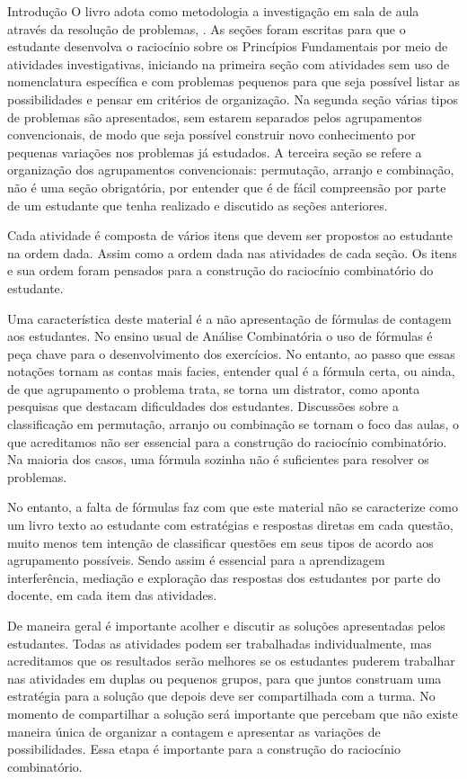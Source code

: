 \begin{apresentacao}{Introdução}
O livro adota como metodologia a investigação em sala de aula através da resolução de problemas, \cite{Ponte}. As seções foram escritas para que o estudante desenvolva o raciocínio sobre os Princípios Fundamentais por meio de atividades investigativas, iniciando na primeira seção com atividades  sem uso de nomenclatura específica e com problemas pequenos para que seja possível listar as possibilidades e pensar em critérios de organização. Na segunda seção várias tipos de problemas são apresentados, sem estarem separados pelos agrupamentos convencionais, de modo que seja possível construir novo conhecimento por pequenas variações nos problemas já estudados. A terceira seção se refere a organização dos agrupamentos convencionais: permutação, arranjo e combinação, não é uma seção obrigatória, por entender que é de fácil compreensão por parte de um estudante que tenha realizado e discutido as seções anteriores.
 
Cada atividade é composta de vários itens que devem ser propostos ao estudante na ordem dada. Assim como a ordem dada nas atividades de cada seção.  Os itens e sua ordem foram pensados para a construção do raciocínio combinatório do estudante.
 
Uma característica deste material é a não apresentação de fórmulas de contagem aos estudantes. No ensino usual de Análise Combinatória o uso de fórmulas é peça chave para o desenvolvimento dos exercícios. No entanto, ao passo que essas notações tornam as contas mais facies, entender qual é a fórmula certa, ou ainda, de que agrupamento o problema trata, se torna um distrator, como aponta pesquisas que destacam dificuldades dos estudantes. Discussões sobre a classificação em permutação, arranjo ou combinação se tornam o foco das aulas, o que acreditamos não ser essencial para a construção do raciocínio combinatório. Na maioria dos casos, uma fórmula sozinha não é suficientes para resolver os problemas.
  
 No entanto, a falta de fórmulas faz com que este material não se caracterize como um livro texto ao estudante com estratégias e respostas diretas  em  cada questão, muito menos tem intenção de  classificar questões em seus tipos de acordo aos agrupamento possíveis. Sendo assim é essencial para a aprendizagem interferência, mediação e exploração das respostas dos estudantes por parte do docente, em cada item das atividades. 
 
 De maneira geral é importante acolher e discutir as soluções apresentadas pelos estudantes. Todas as atividades podem ser trabalhadas individualmente, mas acreditamos que  os resultados serão melhores se os estudantes puderem trabalhar nas atividades em duplas ou pequenos grupos,  para que juntos construam uma estratégia para a solução que depois deve ser compartilhada com a turma.  No momento de compartilhar a solução será importante que percebam que não existe maneira única de organizar a contagem e apresentar as variações de possibilidades. Essa etapa é importante para a construção do raciocínio combinatório.
 

\end{apresentacao}
